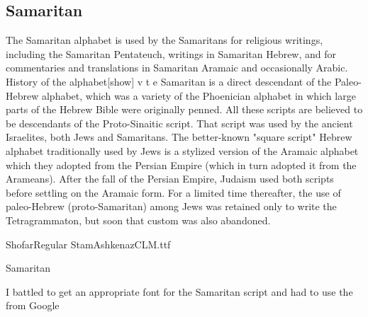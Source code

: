 \subsection{Samaritan}

The Samaritan alphabet is used by the Samaritans for religious writings, including the Samaritan Pentateuch, writings in Samaritan Hebrew, and for commentaries and translations in Samaritan Aramaic and occasionally Arabic.
History of the alphabet[show]
v t e
Samaritan is a direct descendant of the Paleo-Hebrew alphabet, which was a variety of the Phoenician alphabet in which large parts of the Hebrew Bible were originally penned. All these scripts are believed to be descendants of the Proto-Sinaitic script. That script was used by the ancient Israelites, both Jews and Samaritans. The better-known "square script" Hebrew alphabet traditionally used by Jews is a stylized version of the Aramaic alphabet which they adopted from the Persian Empire (which in turn adopted it from the Arameans). After the fall of the Persian Empire, Judaism used both scripts before settling on the Aramaic form. For a limited time thereafter, the use of paleo-Hebrew (proto-Samaritan) among Jews was retained only to write the Tetragrammaton, but soon that custom was also abandoned.

\newfontfamily{}
ShofarRegular StamAshkenazCLM.ttf

\begin{scriptexample}[]{Samaritan}
\bgroup
{}
\egroup
\end{scriptexample}

I battled to get an appropriate font for the Samaritan script and had to use the  from Google
